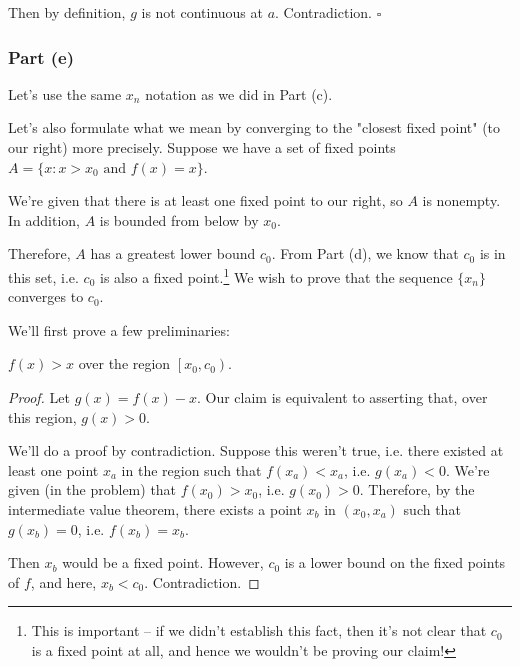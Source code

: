 Then by definition, $g$ is not continuous at $a$. Contradiction. $\square$



\subsubsection{Part (e)}

Let's use the same $x_n$ notation as we did in Part (c). 



Let's also formulate what we mean by converging to the "closest fixed point" (to our right) more precisely. Suppose we have a set of fixed points $A = \{x : x > x_0 \text{ and } f(x) = x\}$. 

We're given that there is at least one fixed point to our right, so $A$ is nonempty. In addition, $A$ is bounded from below by $x_0$. 

Therefore, $A$ has a greatest lower bound $c_0$. From Part (d), we know that $c_0$ is in this set, i.e. $c_0$ is also a fixed point.\footnote{This is important -- if we didn't establish this fact, then it's not clear that $c_0$ is a fixed point at all, and hence we wouldn't be proving our claim!} We wish to prove that the sequence $\{x_n\}$ converges to $c_0$.

We'll first prove a few preliminaries:

\begin{lemma}
\label{l:fp-iter-region}
$f(x) > x$ over the region $\left[x_0, c_0\right)$. 
\end{lemma}
\begin{proof}
Let $g(x) = f(x) - x$. Our claim is equivalent to asserting that, over this region, $g(x) > 0$.

We'll do a proof by contradiction. Suppose this weren't true, i.e. there existed at least one point $x_a$ in the region such that $f(x_a) < x_a$, i.e. $g(x_a) < 0$. We're given (in the problem) that $f(x_0) > x_0$, i.e. $g(x_0) > 0$. Therefore, by the intermediate value theorem, there exists a point $x_b$ in $(x_0, x_a)$ such that $g(x_b) = 0$, i.e. $f(x_b) = x_b$. 

Then $x_b$ would be a fixed point. However, $c_0$ is a lower bound on the fixed points of $f$, and here, $x_b < c_0$. Contradiction.
\end{proof}


